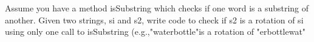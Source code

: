  \label{sssec:ex1_08}

Assume you have a method isSubstring which checks if one word is a substring of another. Given two strings, si and s2, write code to check if s2 is a rotation of si using only one call to isSubstring (e.g.,"waterbottle"is a rotation of "erbottlewat"




